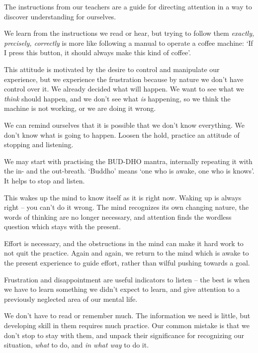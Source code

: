 The instructions from our teachers are a guide for directing attention
in a way to discover understanding for ourselves.

We learn from the instructions we read or hear, but trying to follow
them \emph{exactly, precisely, correctly} is more like following a
manual to operate a coffee machine: `If I press this button, it should
always make this kind of coffee'.

This attitude is motivated by the desire to control and manipulate our
experience, but we experience the frustration because by nature we don't
have control over it. We already decided what will happen. We want to
see what we \emph{think} should happen, and we don't see what \emph{is}
happening, so we think the machine is not working, or we are doing it
wrong.

We can remind ourselves that it is possible that we don't know
everything. We don't know what is going to happen. Loosen the hold,
practice an attitude of stopping and listening.


We may start with practising the BUD-DHO mantra, internally repeating it
with the in- and the out-breath. `Buddho' means `one who is awake, one
who is knows'. It helps to stop and listen.

This wakes up the mind to know itself as it is right now. Waking up is
always right -- you can't do it wrong. The mind recognizes its own
changing nature, the words of thinking are no longer necessary, and
attention finds the wordless question which stays with the present.

Effort is necessary, and the obstructions in the mind can make it hard
work to not quit the practice. Again and again, we return to the mind
which is awake to the present experience to guide effort, rather than
wilful pushing towards a goal.

\enlargethispage*{\baselineskip}

Frustration and disappointment are useful indicators to listen -- the
best is when we have to learn something we didn't expect to learn, and
give attention to a previously neglected area of our mental life.

We don't have to read or remember much. The information we need is
little, but developing skill in them requires much practice. Our common
mistake is that we don't stop to stay with them, and unpack their
significance for recognizing our situation, \emph{what} to do, and
\emph{in what way} to do it.

